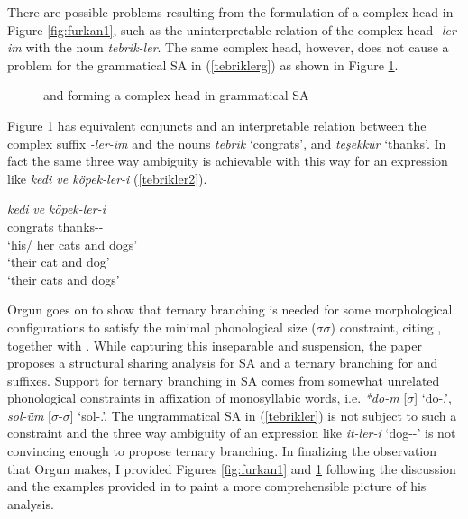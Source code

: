 There are possible problems resulting from the formulation of a complex head in Figure \ref{fig:furkan1}, such as the uninterpretable relation of the complex head \textit{-ler-im} with the noun \textit{tebrik-ler}. The same complex head, however, does not cause a problem for the grammatical SA in (\ref{tebriklerg}) as shown in Figure \ref{fig:furkan2}.

\begin{figure}[hbt!]
    \centering
    \caption{{\Pl} and {\Poss} forming a complex head in grammatical SA}
    \label{fig:furkan2}
\end{figure}

Figure \ref{fig:furkan2} has equivalent conjuncts and an interpretable relation between the complex suffix \textit{-ler-im} and the nouns \textit{tebrik} `congrats', and \textit{teşekkür} `thanks'. In fact the same three way ambiguity is achievable with this way for an expression like \textit{kedi ve köpek-ler-i} (\ref{tebrikler2}).

\begin{exe}
    \ex \label{tebrikler2}
    \gll 
    \textit{kedi} \textit{ve} \textit{köpek-ler-i} \\ congrats {\And} thanks-{\Pl}-{\Poss} \\
    \glt `his/ her cats and dogs' \\ `their cat and dog' \\ `their cats and dogs'
\end{exe}



Orgun goes on to show that ternary branching is needed for some morphological configurations to satisfy the minimal phonological size ($\sigma\sigma$) constraint, citing \cite{ito1989notes}, together with \cite{orgun1992turkish}. While capturing this inseparable {\Pl} and {\Poss} suspension, the paper proposes a structural sharing analysis for SA and a ternary branching for {\Pl} and {\Poss} suffixes. Support for ternary branching in SA comes from somewhat unrelated phonological constraints in affixation of monosyllabic words, i.e. \textit{*do-m} [$\sigma$] `do-{\First}{\Sg}.{\Poss}', \textit{sol-üm} [$\sigma$-$\sigma$] `sol-{\First}{\Sg}.{\Poss}'. The ungrammatical SA in (\ref{tebrikler}) is not subject to such a constraint and the three way ambiguity of an expression like \textit{it-ler-i} `dog-{\Pl}-{\Poss}' is not convincing enough to propose ternary branching. In finalizing the observation that Orgun makes, I provided Figures \ref{fig:furkan1} and \ref{fig:furkan2} following the discussion and the examples provided in \cite{orgun1995flat} to paint a more comprehensible picture of his analysis.

